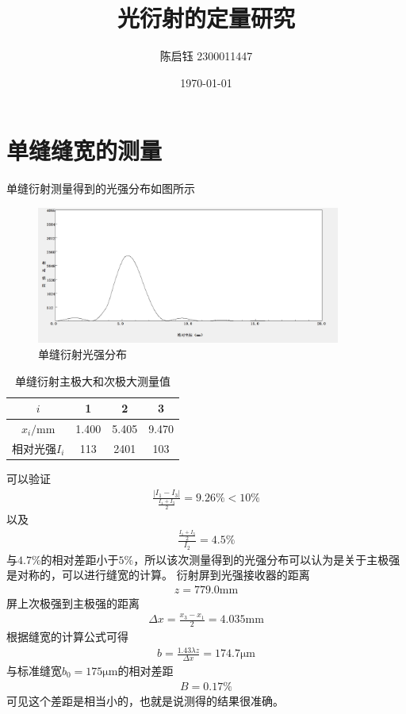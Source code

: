 \documentclass[a4paper]{ctexart}
\title{光衍射的定量研究}
\author{陈启钰\,\,2300011447}
\date{\today}
\begin{document}
	\maketitle
	\tableofcontents
	\newpage
	\section{单缝缝宽的测量}
	单缝衍射测量得到的光强分布如图所示
	\begin{figure}[H]
		\centering
		\includegraphics[width=10cm]{danfeng.jpg}
		\caption{单缝衍射光强分布}
	\end{figure}
	\begin{table}[H]
		\begin{center}
			\caption{单缝衍射主极大和次极大测量值}
			\begin{tabular}{c|ccc}
				$i$&1&2&3\\
				\hline
				$x_i/\mathrm{mm}$&1.400&5.405&9.470\\
				\hline
				相对光强$I_i$&113&2401&103
			\end{tabular}
		\end{center}
	\end{table}
	可以验证
	\begin{align}
		\frac{|I_1-I_3|}{\frac{I_1+I_3}{2}}=9.26\%<10\%
	\end{align}
	以及
	\begin{align}
		\frac{\frac{I_1+I_3}{2}}{I_2}=4.5\%
	\end{align}
	与$4.7\%$的相对差距小于$5\%$，所以该次测量得到的光强分布可以认为是关于主极强是对称的，可以进行缝宽的计算。
	衍射屏到光强接收器的距离
	\begin{align}
		z=779.0\mathrm{mm}
	\end{align}
	屏上次极强到主极强的距离
	\begin{align}
		\Delta x=\frac{x_3-x_1}{2}=4.035\mathrm{mm}
	\end{align}
	根据缝宽的计算公式可得
	\begin{align}
		b=\frac{1.43\lambda z}{\Delta x}=174.7\mathrm{\mu m}
	\end{align}
	与标准缝宽$b_0=175\mathrm{\mu m}$的相对差距
	\begin{align}
		B=0.17\%
	\end{align}
	可见这个差距是相当小的，也就是说测得的结果很准确。
\end{document}
